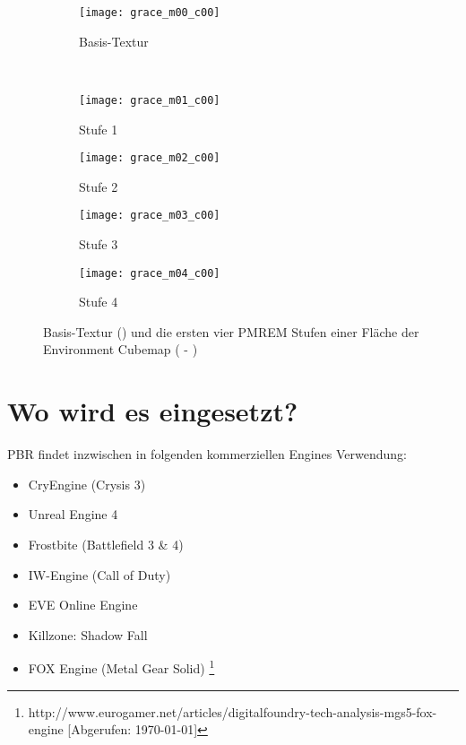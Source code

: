 \begin{figure}
\centering
\begin{subfigure}{0.18\textwidth}
	\texttt{[image: grace\_m00\_c00]}
	\caption{Basis-Textur}\label{fig:pmrem-basis}
\end{subfigure}
~
\begin{subfigure}{0.18\textwidth}
	\texttt{[image: grace\_m01\_c00]}
	\caption{Stufe 1}\label{fig:pmrem-1}
\end{subfigure}
\begin{subfigure}{0.18\textwidth}
	\texttt{[image: grace\_m02\_c00]}
	\caption{Stufe 2}\label{fig:pmrem-2}
\end{subfigure}
\begin{subfigure}{0.18\textwidth}
	\texttt{[image: grace\_m03\_c00]}
	\caption{Stufe 3}\label{fig:pmrem-3}
\end{subfigure}
\begin{subfigure}{0.18\textwidth}
	\texttt{[image: grace\_m04\_c00]}
	\caption{Stufe 4}\label{fig:pmrem-4}
\end{subfigure}
\caption[Beispiel einer PMREM Textur]{Basis-Textur () und die ersten vier \ac{PMREM} Stufen einer Fläche der Environment Cubemap ( - )}
\end{figure}


\section{Wo wird es eingesetzt?}
\label{sec:pbr-wo}

\ac{PBR} findet inzwischen in folgenden kommerziellen Engines Verwendung:
\begin{itemize}
\item CryEngine (Crysis 3) \parencite{Schulz2014}
\item Unreal Engine 4 \parencite{Martin2012}
\item Frostbite (Battlefield 3 \& 4) \parencite{Lagarde2014}
\item IW-Engine (Call of Duty) \parencite{Lazarov2011}
\item EVE Online Engine \parencite{CCP2014}
\item Killzone: Shadow Fall \parencite{Drobot2013}
\item FOX Engine (Metal Gear Solid) \footnote{http://www.eurogamer.net/articles/digitalfoundry-tech-analysis-mgs5-fox-engine [Abgerufen: \today]}
\end{itemize}
